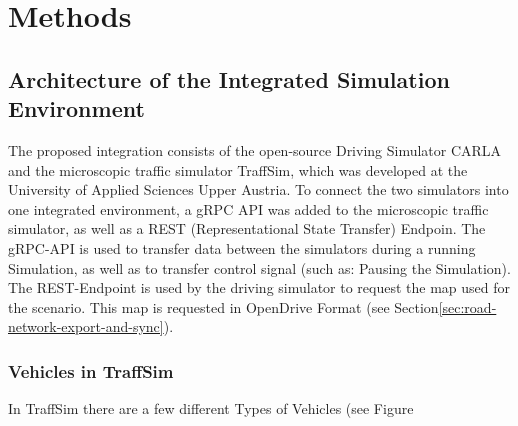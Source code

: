 \chapter{Methods}\label{ch:methods}

\section{Architecture of the Integrated Simulation Environment}\label{sec:architecture-of-the-integrated-simulation-environment}
    The proposed integration consists of the open-source Driving Simulator CARLA\cite{carla2017} and the microscopic traffic simulator TraffSim\cite{backfrieder2013traffsim,backfrieder2014traffsim}, which was developed at the University of Applied Sciences Upper Austria.
    To connect the two simulators into one integrated environment, a gRPC\cite{wang1993grpc} API was added to the microscopic traffic simulator, as well as a REST (Representational State Transfer) Endpoin.
    The gRPC-API is used to transfer data between the simulators during a running Simulation, as well as to transfer control signal (such as: Pausing the Simulation).
    The REST-Endpoint is used by the driving simulator to request the map used for the scenario.
    This map is requested in OpenDrive Format (see Section\ref{sec:road-network-export-and-sync}).

    \subsection{Vehicles in TraffSim}\label{subsec:vehicles-in-traffsim}
        In TraffSim there are a few different Types of Vehicles (see Figure %

